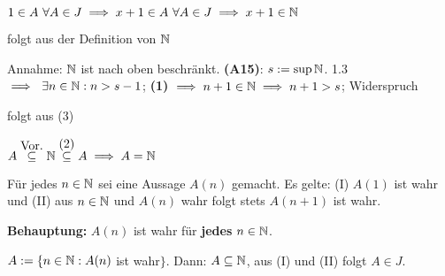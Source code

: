 \documentclass[a4paper,twoside,DIV15,BCOR12mm]{scrbook}
\begin{document}
\begin{beweis}
\begin{liste}
\item $1 \in A \ \forall A \in J \implies x + 1 \in A \ \forall A \in J \implies x+1 \in \mathbb{N}$
\item folgt aus der Definition von $\mathbb{N}$
\item Annahme: $\mathbb{N}$ ist nach oben beschränkt. \textbf{(A15)}: $s := \sup{\ensuremath{\mathbb{N}}}$. 1.3 $\implies \ \exists n \in\mathbb{N}: n > s - 1$; \textbf{(1)} $\implies n+1 \in \mathbb{N} \implies n+1 > s$; Widerspruch
\item folgt aus (3)
\item $A \stackrel{\mbox{Vor.}}{\subseteq} \mathbb{N} \stackrel{\mbox{(2)}}{\subseteq} A \implies A = \mathbb{N}$
\end{liste}
\end{beweis}

\begin{satz}

Für jedes $n \in \mathbb{N}$ sei eine Aussage $A(n)$ gemacht. Es gelte: (I) $A(1)$ ist wahr und (II) aus $n \in \mathbb{N}$ und $A(n)$ wahr folgt stets $A(n+1)$ ist wahr.

\textbf{Behauptung:} $A(n)$ ist wahr für \textbf{jedes} $n \in \mathbb{N}$.
\end{satz}

\begin{beweis} $A := \{ n \in \mathbb{N}: A(n)$ ist wahr$\}$. Dann: $A \subseteq \mathbb{N}$, aus (I) und (II) folgt $A \in J$.
\end{beweis}
\end{document}
